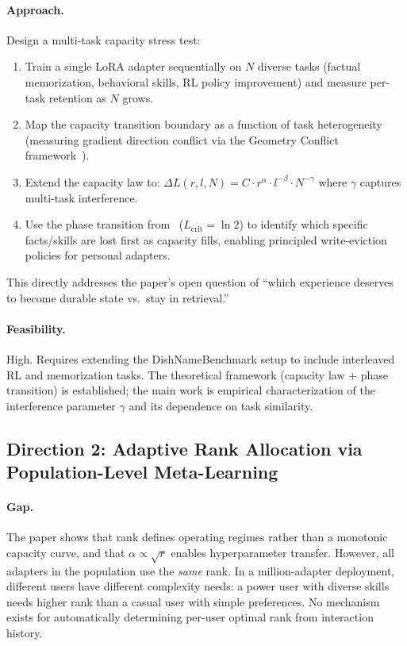 \documentclass[11pt,a4paper]{article}
\begin{document}
\paragraph{Approach.} Design a multi-task capacity stress test:
\begin{enumerate}
\item Train a single LoRA adapter sequentially on $N$ diverse tasks (factual memorization, behavioral skills, RL policy improvement) and measure per-task retention as $N$ grows.
\item Map the capacity transition boundary as a function of task heterogeneity (measuring gradient direction conflict via the Geometry Conflict framework~\cite{geometry2026}).
\item Extend the capacity law to: $\Delta L(r, l, N) = C \cdot r^{\alpha} \cdot l^{-\beta} \cdot N^{-\gamma}$ where $\gamma$ captures multi-task interference.
\item Use the phase transition from~\cite{xu2026lora} ($L_{\mathrm{crit}} = \ln 2$) to identify which specific facts/skills are lost first as capacity fills, enabling principled write-eviction policies for personal adapters.
\end{enumerate}
This directly addresses the paper's open question of ``which experience deserves to become durable state vs.\ stay in retrieval.''

\paragraph{Feasibility.} High. Requires extending the DishNameBenchmark setup to include interleaved RL and memorization tasks. The theoretical framework (capacity law + phase transition) is established; the main work is empirical characterization of the interference parameter $\gamma$ and its dependence on task similarity.

\subsection{Direction 2: Adaptive Rank Allocation via Population-Level Meta-Learning}

\paragraph{Gap.} The paper shows that rank defines operating regimes rather than a monotonic capacity curve, and that $\alpha \propto \sqrt{r}$ enables hyperparameter transfer. However, all adapters in the population use the \emph{same} rank. In a million-adapter deployment, different users have different complexity needs: a power user with diverse skills needs higher rank than a casual user with simple preferences. No mechanism exists for automatically determining per-user optimal rank from interaction history.
\end{document}
